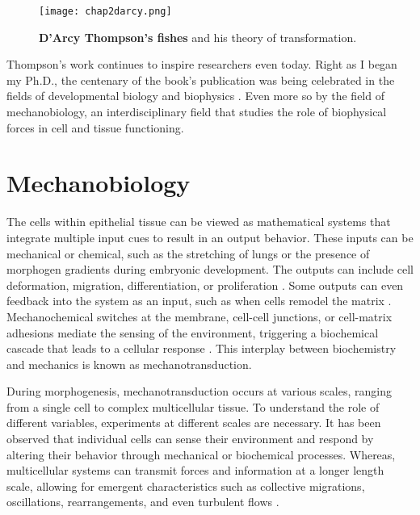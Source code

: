 \begin{figure}[h!]
	\centering
	\texttt{[image: chap2darcy.png]}
	\caption{\label{fig_2_1b} \textbf{D'Arcy Thompson's fishes} and his theory of transformation. \cite{wolfram2017, thompson1979}}
\end{figure}

Thompson's work continues to inspire researchers even today. Right as I began my Ph.D., the centenary of the book's publication was being celebrated in the fields of developmental biology and biophysics \cite{heer2017, nat2017, natphys2017}. Even more so by the field of mechanobiology, an interdisciplinary field that studies the role of biophysical forces in cell and tissue functioning. 

\hypertarget{mechanobiology}{%
\section{Mechanobiology}\label{mechanobiology}}

The cells within epithelial tissue can be viewed as mathematical systems that integrate multiple input cues to result in an output behavior. These inputs can be mechanical or chemical, such as the stretching of lungs or the presence of morphogen gradients during embryonic development. The outputs can include cell deformation, migration, differentiation, or proliferation \cite{kumar2017}. Some outputs can even feedback into the system as an input, such as when cells remodel the matrix \cite{malandrino2018}. Mechanochemical switches at the membrane, cell-cell junctions, or cell-matrix adhesions mediate the sensing of the environment, triggering a biochemical cascade that leads to a cellular response \cite{roca-cusachs2017}. This interplay between biochemistry and mechanics is known as mechanotransduction.

During morphogenesis, mechanotransduction occurs at various scales, ranging from a single cell to complex multicellular tissue. To understand the role of different variables, experiments at different scales are necessary. It has been observed that individual cells can sense their environment and respond by altering their behavior through mechanical or biochemical processes. Whereas, multicellular systems can transmit forces and information at a longer length scale, allowing for emergent characteristics such as collective migrations, oscillations, rearrangements, and even turbulent flows \cite{heer2017, lecuit2011,trepat2018}.

